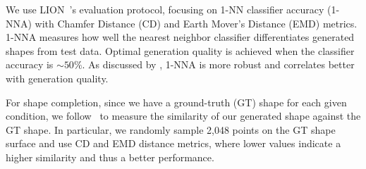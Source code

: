 We use LION~\cite{zeng2022lion}'s evaluation protocol, focusing on 1-NN classifier accuracy (1-NNA) with Chamfer Distance (CD) and Earth Mover's Distance (EMD) metrics.
%
%
1-NNA measures how well the nearest neighbor classifier differentiates generated shapes from test data. 
Optimal generation quality is achieved when the classifier accuracy is ${\sim}50\%$.
%
As discussed by \citet{yang2019pointflow}, 1-NNA is more robust and correlates better with generation quality.


For shape completion, 
since we have a ground-truth (GT) shape for each given condition, we follow~\cite{zhou2021pvd} to measure the similarity of our generated shape against the GT shape.
%
In particular, we randomly sample 2,048 
points on the GT shape surface and use CD and EMD distance metrics, where lower values indicate a higher similarity and thus a better performance.
